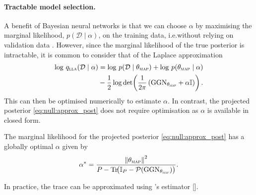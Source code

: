 \paragraph{Tractable model selection.}
\label{sec:null:model_selection}
A benefit of Bayesian neural networks is that we can choose $\alpha$ by maximising the marginal likelihood, $p(\mathcal{D}\mid\alpha)$, on the training data, i.e.\@ without relying on validation data \citep{mackay1995probable}. However, since the marginal likelihood of the true posterior is intractable, it is common to consider that of the Laplace approximation \citep{immer2021scalable}
\begin{align}
\label{eq:null:lml}
\begin{split}
    \log \, q_{\textsc{lla}}(\mathcal{D}\mid\alpha)
      &=
      \log\,p(\mathcal{D}\mid \theta_{\textsc{map}}) + \log\, p(\theta_{\textsc{map}}\mid\alpha)  \\
      &- \frac{1}{2} \log\det\!\left( \frac{1}{2\pi}\left(\mathrm{GGN}_{\theta_{\textsc{map}}} + \alpha \mathbb{I}\right) \right).
\end{split}
\end{align}
This can then be optimised numerically to estimate $\alpha$. In contrast, the projected posterior \eqref{eq:null:approx_post} does not require optimisation as $\alpha$ is available in closed form.
\begin{lemma}
\label{lm:null:opt_alpha}
    The marginal likelihood for the projected posterior \eqref{eq:null:approx_post} has a globally optimal $\alpha$ given by
    \begin{equation}\label{eq:null:opt_alpha}
        \alpha^* = \frac{\left\lVert\theta_{\textsc{map}}\right\rVert^2}{P - \mathrm{Tr}\!\big(\mathbb{I}_P - \mathcal{P}(\mathrm{GGN}_{\theta_{\textsc{map}}})\big)}.
    \end{equation}
\end{lemma}
In practice, the trace can be approximated using \citeauthor{hutchinson1989stochastic}'s estimator [\citeyear{hutchinson1989stochastic}].

